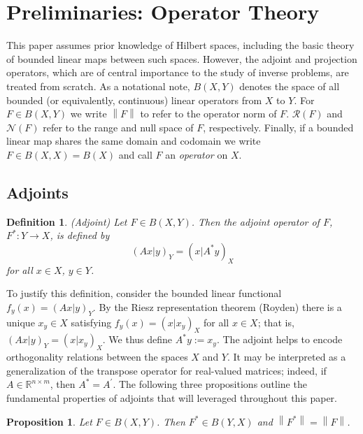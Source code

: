 \documentclass[12pt]{article}
\newcommand*{\norm}[1]{\left\lVert#1\right\rVert}
\newtheorem{definition}{Definition}
\newtheorem{prop}{Proposition}
\begin{document}
 \section{Preliminaries: Operator Theory} \label{preliminaries}
 This paper assumes prior knowledge of Hilbert spaces, including the basic theory of bounded 
 linear maps between such spaces. However, the adjoint and projection operators, which are of central importance 
 to the study of inverse problems, are treated from scratch. As a notational note, $B(X, Y)$ denotes the space of all bounded
 (or equivalently, continuous) linear operators from $X$ to $Y$. For $F \in B(X, Y)$ we write $\norm{F}$
 to refer to the operator norm of $F$. $\mathcal{R}(F)$ and $\mathcal{N}(F)$ refer to the range and 
 null space of $F$, respectively. Finally, if a bounded linear map shares the same domain and codomain we write 
 $F \in B(X, X) = B(X)$ and call $F$ an \textit{operator} on $X$. 
  
\subsection{Adjoints}
 \begin{definition} 
 (Adjoint) Let $F \in B(X, Y)$. Then the adjoint operator of $F$, $F^*: Y \to X$, is defined by 
 	\begin{equation*} 
	(Ax|y)_Y = (x|A^*y)_X
 	\end{equation*} 
	for all $x \in X$, $y \in Y$. 
 \end{definition} 
To justify this definition, consider the bounded linear functional $f_y(x) = (Ax|y)_Y$. By the Riesz representation theorem (Royden) 
there is a unique $x_y \in X$ satisfying $f_y(x) = (x|x_y)_X$ for all $x \in X$; that is, $(Ax|y)_Y = (x|x_y)_X$. 
We thus define $A^*y := x_y$. The adjoint helps to encode orthogonality relations between the spaces $X$ and $Y$. 
It may be interpreted as a generalization of the transpose operator for real-valued matrices; indeed, if $A \in \mathbb{R}^{n \times m}$, 
then $A^* = A^\prime$. The following three propositions outline the fundamental properties of adjoints that will leveraged throughout
this paper. 

\begin{prop} 
Let $F \in B(X, Y)$. Then $F^* \in B(Y, X)$ and $\norm{F^*} = \norm{F}$. 
\end{prop}
\end{document}
